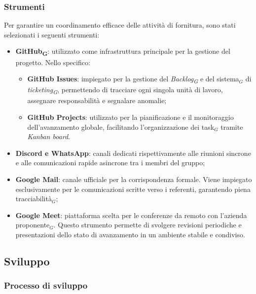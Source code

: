 \documentclass[a4paper, 10pt]{article}
\begin{document}
\label{subsubsec:gestione-com}
\subsubsection{Strumenti}
Per garantire un coordinamento efficace delle attività di fornitura, sono stati selezionati i seguenti strumenti:
\begin{itemize}
    \item \textbf{GitHub\textsubscript{G}}: utilizzato come infrastruttura principale per la gestione del progetto. Nello specifico:
    \begin{itemize}
        \item \textbf{GitHub Issues}: impiegato per la gestione del \textit{Backlog\textsubscript{G}} e del sistema$_G$ di \textit{ticketing\textsubscript{G}}, permettendo di tracciare ogni singola unità di lavoro, assegnare responsabilità e segnalare anomalie;
        \item \textbf{GitHub Projects}: utilizzato per la pianificazione e il monitoraggio dell'avanzamento globale, facilitando l'organizzazione dei task$_G$ tramite \textit{Kanban board}.
    \end{itemize}
    
    \item \textbf{Discord e WhatsApp}: canali dedicati rispettivamente alle riunioni sincrone e alle comunicazioni rapide asincrone tra i membri del gruppo;
    
    \item \textbf{Google Mail}: canale ufficiale per la corrispondenza formale. Viene impiegato esclusivamente per le comunicazioni scritte verso i referenti, garantendo piena tracciabilità$_G$;
    
    \item \textbf{Google Meet}: piattaforma scelta per le conferenze da remoto con l'azienda proponente$_G$. Questo strumento permette di svolgere revisioni periodiche e presentazioni dello stato di avanzamento in un ambiente stabile e condiviso.
\end{itemize}

\subsection{Sviluppo}

\subsubsection{Processo di sviluppo}
\end{document}

